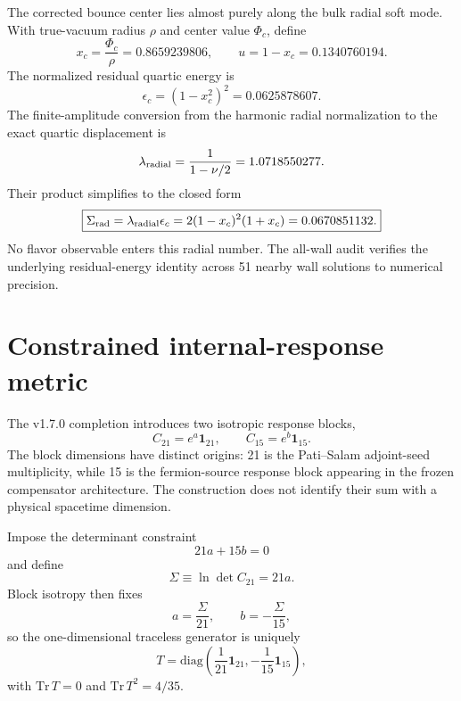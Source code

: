 \documentclass[11pt]{article}
\begin{document}
The corrected bounce center lies almost purely along the bulk radial soft mode. With true-vacuum radius $\rho$ and center value $\Phi_c$, define
\begin{equation}
x_c=\frac{\Phi_c}{\rho}=0.8659239806,
\qquad
u=1-x_c=0.1340760194.
\end{equation}
The normalized residual quartic energy is
\begin{equation}
\epsilon_c=(1-x_c^2)^2=0.0625878607.
\end{equation}
The finite-amplitude conversion from the harmonic radial normalization to the exact quartic displacement is
\begin{equation}
\lambda_{\rm radial}=\frac{1}{1-\nu/2}=1.0718550277.
\end{equation}
Their product simplifies to the closed form
\begin{equation}
\boxed{
\Sigma_{\rm rad}
=\lambda_{\rm radial}\epsilon_c
=2(1-x_c)^2(1+x_c)
=0.0670851132.}
\end{equation}
No flavor observable enters this radial number. The all-wall audit verifies the underlying residual-energy identity across 51 nearby wall solutions to numerical precision.

\section{Constrained internal-response metric}

The v1.7.0 completion introduces two isotropic response blocks,
\begin{equation}
C_{21}=e^a\mathbf 1_{21},\qquad
C_{15}=e^b\mathbf 1_{15}.
\end{equation}
The block dimensions have distinct origins: 21 is the Pati--Salam adjoint-seed multiplicity, while 15 is the fermion-source response block appearing in the frozen compensator architecture. The construction does not identify their sum with a physical spacetime dimension.

Impose the determinant constraint
\begin{equation}
21a+15b=0
\end{equation}
and define
\begin{equation}
\Sigma\equiv\ln\det C_{21}=21a.
\end{equation}
Block isotropy then fixes
\begin{equation}
\boxed{a=\frac{\Sigma}{21},\qquad b=-\frac{\Sigma}{15}},
\end{equation}
so the one-dimensional traceless generator is uniquely
\begin{equation}
\boxed{
T=\mathrm{diag}\!\left(
\frac1{21}\mathbf 1_{21},
-\frac1{15}\mathbf 1_{15}
\right)},
\end{equation}
with $\mathrm{Tr}\,T=0$ and $\mathrm{Tr}\,T^2=4/35$.
\end{document}
